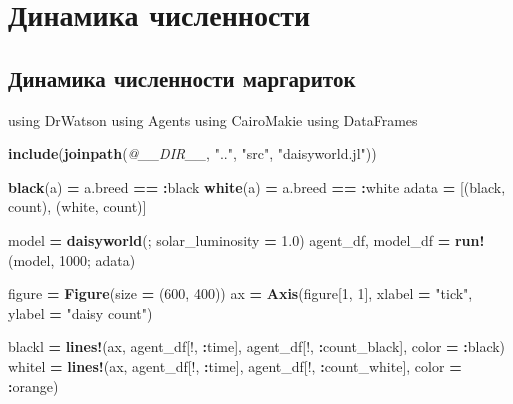 \documentclass[
  english,
  russian,
  12pt,
  a4paper,
  DIV=11,
  numbers=noendperiod]{scrreprt}
\newenvironment{Shaded}{\begin{snugshade}}{\end{snugshade}}
\newcommand{\BuiltInTok}[1]{#1}
\newcommand{\FloatTok}[1]{\textcolor[rgb]{0.00,0.00,0.81}{#1}}
\newcommand{\FunctionTok}[1]{\textcolor[rgb]{0.13,0.29,0.53}{\textbf{#1}}}
\newcommand{\ImportTok}[1]{#1}
\newcommand{\NormalTok}[1]{#1}
\newcommand{\OperatorTok}[1]{\textcolor[rgb]{0.81,0.36,0.00}{\textbf{#1}}}
\newcommand{\PreprocessorTok}[1]{\textcolor[rgb]{0.56,0.35,0.01}{\textit{#1}}}
\newcommand{\StringTok}[1]{\textcolor[rgb]{0.31,0.60,0.02}{#1}}
\begin{document}
\section{Динамика
численности}\label{ux434ux438ux43dux430ux43cux438ux43aux430-ux447ux438ux441ux43bux435ux43dux43dux43eux441ux442ux438-1}

\subsection{Динамика численности
маргариток}\label{ux434ux438ux43dux430ux43cux438ux43aux430-ux447ux438ux441ux43bux435ux43dux43dux43eux441ux442ux438-ux43cux430ux440ux433ux430ux440ux438ux442ux43eux43a}

\begin{Shaded}
\begin{Highlighting}[]
\ImportTok{using} \BuiltInTok{DrWatson}
\ImportTok{using} \BuiltInTok{Agents}
\ImportTok{using} \BuiltInTok{CairoMakie}
\ImportTok{using} \BuiltInTok{DataFrames}

\FunctionTok{include}\NormalTok{(}\FunctionTok{joinpath}\NormalTok{(}\PreprocessorTok{@\_\_DIR\_\_}\NormalTok{, }\StringTok{".."}\NormalTok{, }\StringTok{"src"}\NormalTok{, }\StringTok{"daisyworld.jl"}\NormalTok{))}

\FunctionTok{black}\NormalTok{(a) }\OperatorTok{=}\NormalTok{ a.breed }\OperatorTok{==} \OperatorTok{:}\NormalTok{black}
\FunctionTok{white}\NormalTok{(a) }\OperatorTok{=}\NormalTok{ a.breed }\OperatorTok{==} \OperatorTok{:}\NormalTok{white}
\NormalTok{adata }\OperatorTok{=}\NormalTok{ [(black, count), (white, count)]}

\NormalTok{model }\OperatorTok{=} \FunctionTok{daisyworld}\NormalTok{(; solar\_luminosity }\OperatorTok{=} \FloatTok{1.0}\NormalTok{)}
\NormalTok{agent\_df, model\_df }\OperatorTok{=} \FunctionTok{run!}\NormalTok{(model, }\FloatTok{1000}\NormalTok{; adata)}

\NormalTok{figure }\OperatorTok{=} \FunctionTok{Figure}\NormalTok{(size }\OperatorTok{=}\NormalTok{ (}\FloatTok{600}\NormalTok{, }\FloatTok{400}\NormalTok{))}
\NormalTok{ax }\OperatorTok{=} \FunctionTok{Axis}\NormalTok{(figure[}\FloatTok{1}\NormalTok{, }\FloatTok{1}\NormalTok{], xlabel }\OperatorTok{=} \StringTok{"tick"}\NormalTok{, ylabel }\OperatorTok{=} \StringTok{"daisy count"}\NormalTok{)}

\NormalTok{blackl }\OperatorTok{=} \FunctionTok{lines!}\NormalTok{(ax, agent\_df[!, }\OperatorTok{:}\NormalTok{time], agent\_df[!, }\OperatorTok{:}\NormalTok{count\_black], color }\OperatorTok{=} \OperatorTok{:}\NormalTok{black)}
\NormalTok{whitel }\OperatorTok{=} \FunctionTok{lines!}\NormalTok{(ax, agent\_df[!, }\OperatorTok{:}\NormalTok{time], agent\_df[!, }\OperatorTok{:}\NormalTok{count\_white], color }\OperatorTok{=} \OperatorTok{:}\NormalTok{orange)}


\end{Highlighting}
\end{Shaded}
\end{document}
